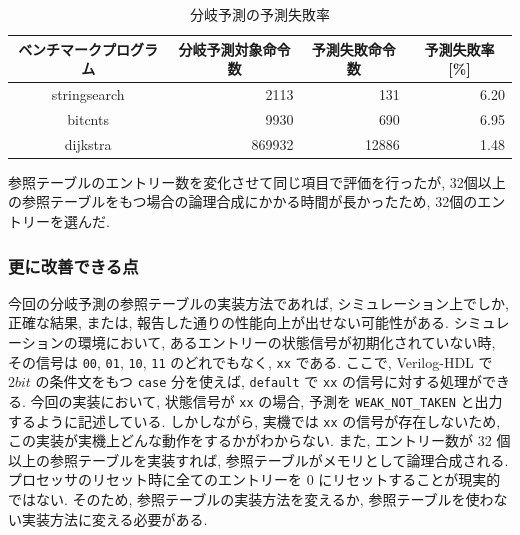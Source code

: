 \documentclass[../improvements.tex]{subflies}
\begin{document}
  \begin{table}[]
    \centering
    \begin{tabular}{|c|r|r|r|}
    \hline
    ベンチマークプログラム & \multicolumn{1}{c|}{分岐予測対象命令数} & \multicolumn{1}{c|}{予測失敗命令数} & \multicolumn{1}{c|}{予測失敗率 {[}\%{]}} \\ \hline
    stringsearch & 2113 & 131 & 6.20 \\
    bitcnts & 9930 & 690 & 6.95 \\
    dijkstra & 869932 & 12886 & 1.48 \\ \hline
    \end{tabular}
    \caption{分岐予測の予測失敗率}
    \label{table:miss-rate}
  \end{table}

  参照テーブルのエントリー数を変化させて同じ項目で評価を行ったが, 
  32個以上の参照テーブルをもつ場合の論理合成にかかる時間が長かったため, 
  32個のエントリーを選んだ.

  \subsubsection{更に改善できる点}
  今回の分岐予測の参照テーブルの実装方法であれば, 
  シミュレーション上でしか, 正確な結果, または, 報告した通りの性能向上が出せない可能性がある.
  シミュレーションの環境において, あるエントリーの状態信号が初期化されていない時, 
  その信号は \verb|00|, \verb|01|, \verb|10|, \verb|11| のどれでもなく, \verb|xx| である.
  ここで, Verilog-HDL で $2bit$ の条件文をもつ \verb|case| 分を使えば, 
  \verb|default| で \verb|xx| の信号に対する処理ができる.
  今回の実装において, 状態信号が \verb|xx| の場合, 
  予測を \verb|WEAK_NOT_TAKEN| と出力するように記述している.
  しかしながら, 実機では \verb|xx| の信号が存在しないため, 
  この実装が実機上どんな動作をするかがわからない.
  また, エントリー数が 32 個以上の参照テーブルを実装すれば, 
  参照テーブルがメモリとして論理合成される.
  プロセッサのリセット時に全てのエントリーを 0 にリセットすることが現実的ではない.
  そのため, 参照テーブルの実装方法を変えるか, 参照テーブルを使わない実装方法に変える必要がある.
\end{document}
